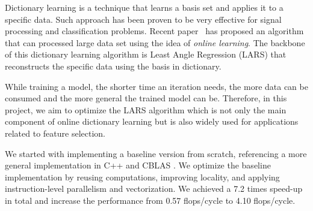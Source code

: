 
Dictionary learning is a technique that learns a basis set and applies it to a specific data.
Such approach has been proven to be very effective for signal processing and classification problems.
Recent paper~\cite{Mairal:2010} has proposed an algorithm that can processed large data set using the idea of \emph{online learning}.
The backbone of this dictionary learning algorithm is Least Angle Regression (LARS) that reconstructs the specific data using the basis in dictionary.

While training a model, the shorter time an iteration needs, the more data can be consumed and the more general the trained model can be.
Therefore, in this project, we aim to optimize the LARS algorithm which is not only the main component of online dictionary learning but is also widely used for applications related to feature selection.

We started with implementing a baseline version from scratch, referencing a more general implementation in C++ and CBLAS \cite{larscpp}.
We optimize the baseline implementation by reusing computations, improving locality, and applying instruction-level parallelism and vectorization. 
We achieved a 7.2 times speed-up in total and increase the performance from 0.57 flops/cycle to 4.10 flops/cycle.




